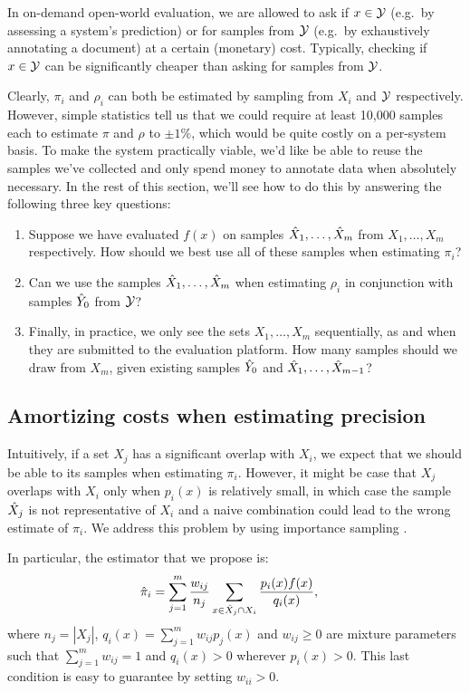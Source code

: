In on-demand open-world evaluation, we are allowed to ask if $x \in \mathcal{Y}$ (e.g.\ by assessing a system's prediction) or for samples from $\mathcal{Y}$ (e.g.\ by exhaustively annotating a document) at a certain (monetary) cost.
Typically, checking if $x \in \mathcal{Y}$ can be significantly cheaper than asking for samples from $\mathcal{Y}$.

Clearly, $\pi_i$ and $\rho_i$ can both be estimated by sampling from $X_i$ and $\mathcal{Y}$ respectively.
However, simple statistics tell us that we could require at least 10,000 samples each to estimate $\pi$ and $\rho$ to $\pm 1\%$, which would be quite costly on a per-system basis.
To make the system practically viable, we'd like be able to reuse the samples we've collected and only spend money to annotate data when absolutely necessary.
In the rest of this section, we'll see how to do this by answering the following three key questions:
\begin{enumerate}
  \item Suppose we have evaluated $f(x)$ on samples ${\hat{X}}_1, \ldots, {\hat{X}}_m$ from $X_1, \ldots, X_m$ respectively. How should we best use all of these samples when estimating $\pi_i$?
  \item 
    Can we use the samples ${\hat{X}}_1, \ldots, {\hat{X}}_m$ when estimating $\rho_i$ in conjunction with samples ${\hat{Y}}_0$ from $\mathcal{Y}$?
  \item Finally, in practice, we only see the sets $X_1, \ldots, X_m$ sequentially, as and when they are submitted to the evaluation platform. How many samples should we draw from $X_m$, given existing samples ${\hat{Y}}_0$ and ${\hat{X}}_1, \ldots, {\hat{X}}_{m-1}$?
\end{enumerate}

\subsection{Amortizing costs when estimating precision}

Intuitively, if a set $X_j$ has a significant overlap with $X_i$, we expect that we should be able to its samples when estimating $\pi_i$.
However, it might be case that $X_j$ overlaps with $X_i$ only when $p_i(x)$ is relatively small, in which case the sample ${\hat{X}}_j$ is not representative of $X_i$ and a naive combination could lead to the wrong estimate of $\pi_i$.
We address this problem by using importance sampling \citep{owen2013monte}.

In particular, the estimator that we propose is:
\begin{align*}
  {\hat{\pi}}_i &= \sum_{j=1}^m \frac{w_{ij}}{n_{j}} \sum_{x \in {\hat{X}}_j \cap X_i} \frac{p_i(x) f(x)}{q_i(x)},
\end{align*}
where $n_{j} = |X_j|$, $q_i(x) = \sum_{j=1}^m w_{ij} p_j(x)$ and $w_{ij} \ge 0$ are mixture parameters such that $\sum_{j=1}^m w_{ij} = 1$ and $q_i(x) > 0$ wherever $p_i(x) > 0$.
This last condition is easy to guarantee by setting $w_{ii} > 0$.

